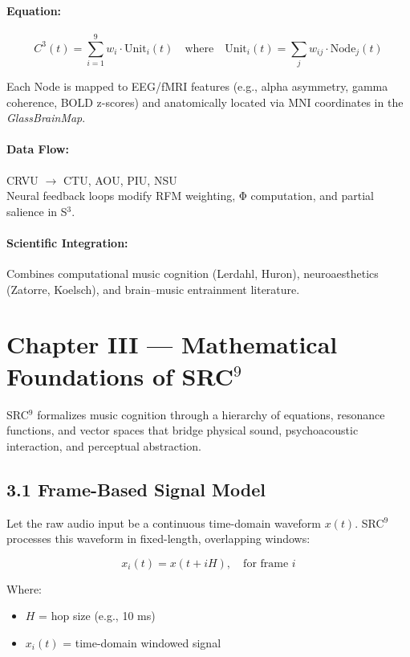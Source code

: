 \documentclass[10pt]{article}
\begin{document}
\paragraph{Equation:}
\[
C^{3}(t) = \sum_{i=1}^{9} w_i \cdot \text{Unit}_i(t)
\quad \text{where} \quad
\text{Unit}_i(t) = \sum_j w_{ij} \cdot \text{Node}_j(t)
\]

Each Node is mapped to EEG/fMRI features (e.g., alpha asymmetry, gamma coherence, BOLD z-scores) and anatomically located via MNI coordinates in the \textit{GlassBrainMap}.

\paragraph{Data Flow:}
CRVU $\rightarrow$ CTU, AOU, PIU, NSU \\
Neural feedback loops modify RFM weighting, Φ computation, and partial salience in S$^{3}$.

\paragraph{Scientific Integration:}  
Combines computational music cognition (Lerdahl, Huron), neuroaesthetics (Zatorre, Koelsch), and brain–music entrainment literature.

\section*{Chapter III — Mathematical Foundations of SRC$^{9}$}

SRC$^{9}$ formalizes music cognition through a hierarchy of equations, resonance functions, and vector spaces that bridge physical sound, psychoacoustic interaction, and perceptual abstraction.

\subsection*{3.1 Frame-Based Signal Model}

Let the raw audio input be a continuous time-domain waveform $x(t)$. SRC$^{9}$ processes this waveform in fixed-length, overlapping windows:

\begin{equation}
x_i(t) = x(t + iH), \quad \text{for frame } i
\end{equation}

Where:
\begin{itemize}
  \item $H$ = hop size (e.g., 10 ms)
  \item $x_i(t)$ = time-domain windowed signal
\end{itemize}
\end{document}
